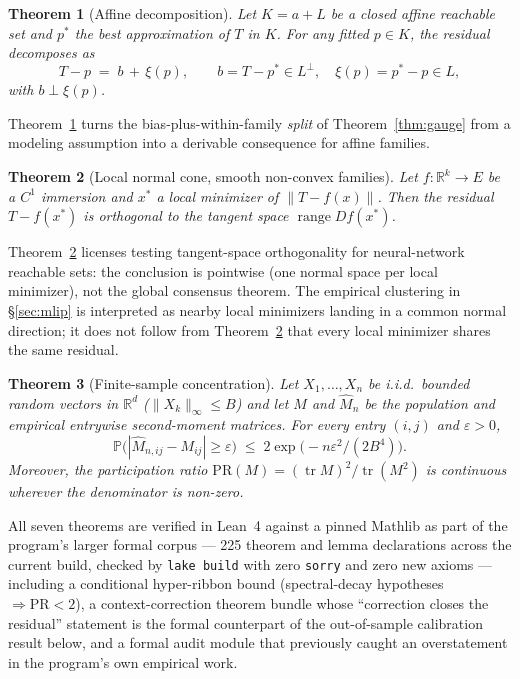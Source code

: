 \documentclass[11pt]{article}
\newtheorem{theorem}{Theorem}
\begin{document}
\begin{theorem}[Affine decomposition]\label{thm:affine}
Let $K = a + L$ be a closed affine reachable set and $p^*$ the best
approximation of $T$ in $K$. For any fitted $p \in K$, the residual decomposes
as
\[
T - p \;=\; b \, +\, \xi(p),
\qquad b = T - p^* \in L^\perp, \quad \xi(p) = p^* - p \in L,
\]
with $b \perp \xi(p)$.
\end{theorem}

Theorem~\ref{thm:affine} turns the bias-plus-within-family \emph{split} of
Theorem~\ref{thm:gauge} from a modeling assumption into a derivable
consequence for affine families.

\begin{theorem}[Local normal cone, smooth non-convex families]\label{thm:smooth}
Let $f: \mathbb{R}^k \to E$ be a $C^1$ immersion and $x^*$ a local minimizer
of $\|T - f(x)\|$. Then the residual $T - f(x^*)$ is orthogonal to the tangent
space $\operatorname{range} Df(x^*)$.
\end{theorem}

Theorem~\ref{thm:smooth} licenses testing tangent-space orthogonality for
neural-network reachable sets: the conclusion is pointwise (one normal space
per local minimizer), not the global consensus theorem. The empirical
clustering in \S\ref{sec:mlip} is interpreted as nearby local minimizers
landing in a common normal direction; it does not follow from
Theorem~\ref{thm:smooth} that every local minimizer shares the same residual.

\begin{theorem}[Finite-sample concentration]\label{thm:concentration}
Let $X_1, \dots, X_n$ be i.i.d.\ bounded random vectors in $\mathbb{R}^d$
($\|X_k\|_\infty \le B$) and let $M$ and $\widehat M_n$ be the population and
empirical entrywise second-moment matrices. For every entry $(i,j)$ and
$\varepsilon > 0$,
\[
\mathbb{P}\bigl(|\widehat M_{n,ij} - M_{ij}| \ge \varepsilon\bigr)
\;\le\; 2 \exp\!\bigl(-n\varepsilon^2 / (2B^4)\bigr).
\]
Moreover, the participation ratio
$\mathrm{PR}(M) = (\operatorname{tr} M)^2 / \operatorname{tr}(M^2)$ is
continuous wherever the denominator is non-zero.
\end{theorem}

All seven theorems are verified in Lean~4 against a pinned Mathlib as part of
the program's larger formal corpus --- 225 theorem and lemma declarations
across the current build, checked by \texttt{lake build} with zero
\texttt{sorry} and zero new axioms --- including a conditional hyper-ribbon
bound (spectral-decay hypotheses $\Rightarrow \mathrm{PR}<2$), a
context-correction theorem bundle whose ``correction closes the residual''
statement is the formal counterpart of the out-of-sample calibration result
below, and a formal audit module that previously caught an overstatement in
the program's own empirical work.
\end{document}
